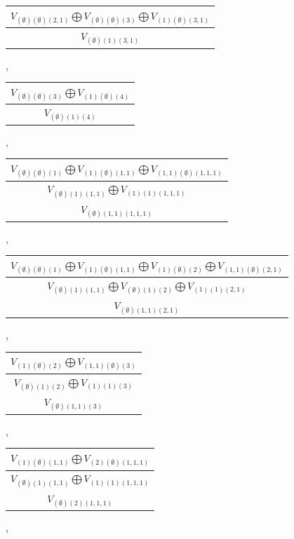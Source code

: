 \documentclass[letterpaper,11pt]{article}
\begin{document}
	\begin{tabular}{| c |}
		\hline
		$V_{(\emptyset)(\emptyset)(2,1)}$$\bigoplus$$V_{(\emptyset)(\emptyset)(3)}$$\bigoplus$$V_{(1)(\emptyset)(3,1)}$\\
		\hline
		$V_{(\emptyset)(1)(3,1)}$\\
		\hline
	\end{tabular}, 
	\begin{tabular}{| c |}
		\hline
		$V_{(\emptyset)(\emptyset)(3)}$$\bigoplus$$V_{(1)(\emptyset)(4)}$\\
		\hline
		$V_{(\emptyset)(1)(4)}$\\
		\hline
	\end{tabular}, 
	\newline 
	\begin{tabular}{| c |}
		\hline
		$V_{(\emptyset)(\emptyset)(1)}$$\bigoplus$$V_{(1)(\emptyset)(1,1)}$$\bigoplus$$V_{(1,1)(\emptyset)(1,1,1)}$\\
		\hline
		$V_{(\emptyset)(1)(1,1)}$$\bigoplus$$V_{(1)(1)(1,1,1)}$\\
		\hline
		$V_{(\emptyset)(1,1)(1,1,1)}$\\
		\hline
	\end{tabular}, 
	\begin{tabular}{| c |}
		\hline
		$V_{(\emptyset)(\emptyset)(1)}$$\bigoplus$$V_{(1)(\emptyset)(1,1)}$$\bigoplus$$V_{(1)(\emptyset)(2)}$$\bigoplus$$V_{(1,1)(\emptyset)(2,1)}$\\
		\hline
		$V_{(\emptyset)(1)(1,1)}$$\bigoplus$$V_{(\emptyset)(1)(2)}$$\bigoplus$$V_{(1)(1)(2,1)}$\\
		\hline
		$V_{(\emptyset)(1,1)(2,1)}$\\
		\hline
	\end{tabular}, 
	\newline 
	\begin{tabular}{| c |}
		\hline
		$V_{(1)(\emptyset)(2)}$$\bigoplus$$V_{(1,1)(\emptyset)(3)}$\\
		\hline
		$V_{(\emptyset)(1)(2)}$$\bigoplus$$V_{(1)(1)(3)}$\\
		\hline
		$V_{(\emptyset)(1,1)(3)}$\\
		\hline
	\end{tabular}, 
	\begin{tabular}{| c |}
		\hline
		$V_{(1)(\emptyset)(1,1)}$$\bigoplus$$V_{(2)(\emptyset)(1,1,1)}$\\
		\hline
		$V_{(\emptyset)(1)(1,1)}$$\bigoplus$$V_{(1)(1)(1,1,1)}$\\
		\hline
		$V_{(\emptyset)(2)(1,1,1)}$\\
		\hline
	\end{tabular}, 
\end{document}
